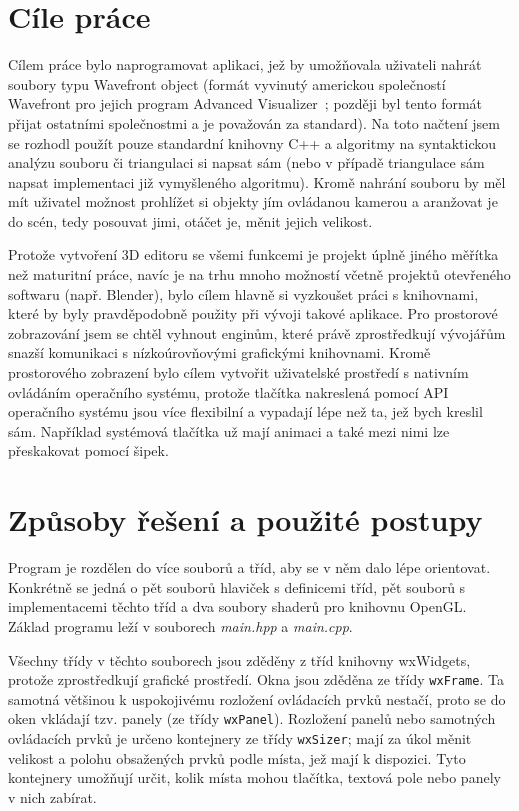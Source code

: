 \documentclass[a4paper, 11pt]{report}
\begin{document}
\chapter{Cíle práce}
Cílem práce bylo naprogramovat aplikaci, jež by umožňovala uživateli nahrát soubory typu Wavefront object (formát vyvinutý americkou společností Wavefront pro jejich program Advanced Visualizer~\cite{wiki:obj}; později byl tento formát přijat ostatními společnostmi a je považován za standard). Na toto načtení jsem se rozhodl použít pouze standardní knihovny C++ a algoritmy na syntaktickou analýzu souboru či triangulaci si napsat sám (nebo v případě triangulace sám napsat implementaci již vymyšleného algoritmu). Kromě nahrání souboru by měl mít uživatel možnost prohlížet si objekty jím ovládanou kamerou a aranžovat je do scén, tedy posouvat jimi, otáčet je, měnit jejich velikost.

Protože vytvoření 3D editoru se všemi funkcemi je projekt úplně jiného měřítka než maturitní práce, navíc je na trhu mnoho možností včetně projektů otevřeného softwaru (např. Blender), bylo cílem hlavně si vyzkoušet práci s knihovnami, které by byly pravděpodobně použity při vývoji takové aplikace. Pro prostorové zobrazování jsem se chtěl vyhnout enginům, které právě zprostředkují vývojářům snazší komunikaci s nízkoúrovňovými grafickými knihovnami. Kromě prostorového zobrazení bylo cílem vytvořit uživatelské prostředí s nativním ovládáním operačního systému, protože tlačítka nakreslená pomocí API operačního systému jsou více flexibilní a vypadají lépe než ta, jež bych kreslil sám. Například systémová tlačítka už mají animaci a také mezi nimi lze přeskakovat pomocí šipek.

\chapter{Způsoby řešení a použité postupy}
Program je rozdělen do více souborů a tříd, aby se v něm dalo lépe orientovat. Konkrétně se jedná o pět souborů hlaviček s definicemi tříd, pět souborů s implementacemi těchto tříd a dva soubory shaderů pro knihovnu OpenGL. Základ programu leží v souborech \emph{main.hpp} a \emph{main.cpp}.

Všechny třídy v těchto souborech jsou zděděny z tříd knihovny wxWidgets, protože zprostředkují grafické prostředí. Okna jsou zděděna ze třídy \texttt{wxFrame}. Ta samotná většinou k uspokojivému rozložení ovládacích prvků nestačí, proto se do oken vkládají tzv. panely (ze třídy \texttt{wxPanel}). Rozložení panelů nebo samotných ovládacích prvků je určeno kontejnery ze třídy \texttt{wxSizer}; mají za úkol měnit velikost a polohu obsažených prvků podle místa, jež mají k dispozici. Tyto kontejnery umožňují určit, kolik místa mohou tlačítka, textová pole nebo panely v nich zabírat.
\end{document}

